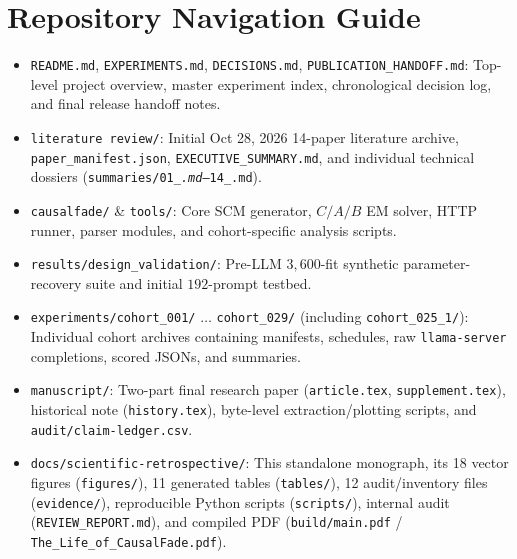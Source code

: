 \chapter{Repository Navigation Guide}\label{app:navigation}
\begin{itemize}
  \item \texttt{README.md}, \texttt{EXPERIMENTS.md}, \texttt{DECISIONS.md}, \texttt{PUBLICATION\_HANDOFF.md}: Top-level project overview, master experiment index, chronological decision log, and final release handoff notes.
  \item \texttt{literature review/}: Initial Oct 28, 2026 14-paper literature archive, \texttt{paper\_manifest.json}, \texttt{EXECUTIVE\_SUMMARY.md}, and individual technical dossiers (\texttt{summaries/01\_\emph{.md}--\texttt{14\_}.md}).
  \item \texttt{causalfade/} \& \texttt{tools/}: Core SCM generator, $C/A/B$ EM solver, HTTP runner, parser modules, and cohort-specific analysis scripts.
  \item \texttt{results/design\_validation/}: Pre-LLM $3{,}600$-fit synthetic parameter-recovery suite and initial $192$-prompt testbed.
  \item \texttt{experiments/cohort\_001/} $\dots$ \texttt{cohort\_029/} (including \texttt{cohort\_025\_1/}): Individual cohort archives containing manifests, schedules, raw \texttt{llama-server} completions, scored JSONs, and summaries.
  \item \texttt{manuscript/}: Two-part final research paper (\texttt{article.tex}, \texttt{supplement.tex}), historical note (\texttt{history.tex}), byte-level extraction/plotting scripts, and \texttt{audit/claim-ledger.csv}.
  \item \texttt{docs/scientific-retrospective/}: This standalone monograph, its 18 vector figures (\texttt{figures/}), 11 generated tables (\texttt{tables/}), 12 audit/inventory files (\texttt{evidence/}), reproducible Python scripts (\texttt{scripts/}), internal audit (\texttt{REVIEW\_REPORT.md}), and compiled PDF (\texttt{build/main.pdf} / \texttt{The\_Life\_of\_CausalFade.pdf}).
\end{itemize}

